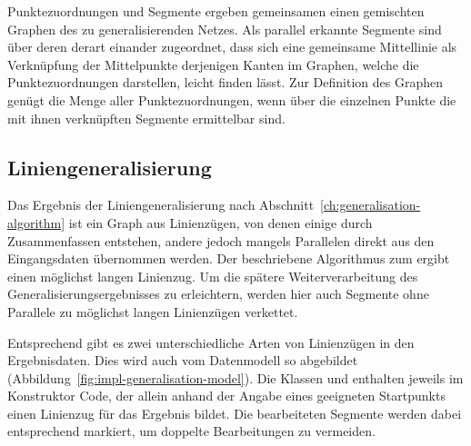 \documentclass[../main/thesis.tex]{subfiles}
\begin{document}
Punktezuordnungen und Segmente ergeben gemeinsamen einen gemischten Graphen des zu generalisierenden Netzes.
Als parallel erkannte Segmente sind über deren  derart einander zugeordnet, dass sich eine gemeinsame Mittellinie als Verknüpfung der Mittelpunkte derjenigen Kanten im Graphen, welche die Punktezuordnungen darstellen, leicht finden lässt.
Zur Definition des Graphen genügt die Menge aller Punktezuordnungen, wenn über die einzelnen Punkte die mit ihnen verknüpften Segmente ermittelbar sind.




\subsection{Liniengeneralisierung}
\label{ch:impl-generalisation}

Das Ergebnis der Liniengeneralisierung nach Abschnitt~\ref{ch:generalisation-algorithm} ist ein Graph aus Linienzügen, von denen einige durch Zusammenfassen entstehen, andere jedoch mangels Parallelen direkt aus den Eingangsdaten übernommen werden.
Der beschriebene Algorithmus zum  ergibt einen möglichst langen Linienzug.
Um die spätere Weiterverarbeitung des Generalisierungsergebnisses zu erleichtern, werden hier auch Segmente ohne Parallele zu möglichst langen Linienzügen verkettet.


Entsprechend gibt es zwei unterschiedliche Arten von Linienzügen in den Ergebnisdaten.
Dies wird auch vom Datenmodell so abgebildet (Abbildung~\ref{fig:impl-generalisation-model}).
Die Klassen  und  enthalten jeweils im Konstruktor Code, der allein anhand der Angabe eines geeigneten Startpunkts einen Linienzug für das Ergebnis bildet.
Die bearbeiteten Segmente werden dabei entsprechend markiert, um doppelte Bearbeitungen zu vermeiden.
\end{document}
